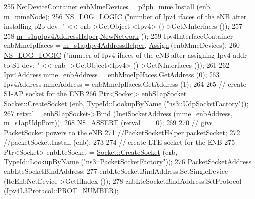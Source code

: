 \begin{DoxyCode}
255   NetDeviceContainer enbMmeDevices = p2ph\_mme.Install (enb, \hyperlink{classns3_1_1MmWavePointToPointEpcHelper_a4e2e32e1abb0ca817e30be4eb46ebfd0}{m\_mmeNode});
256   \hyperlink{group__logging_ga88acd260151caf2db9c0fc84997f45ce}{NS\_LOG\_LOGIC} (\textcolor{stringliteral}{"number of Ipv4 ifaces of the eNB after installing p2p dev: "} << enb->GetObject
      <Ipv4> ()->GetNInterfaces ());  
257 
258   \hyperlink{classns3_1_1MmWavePointToPointEpcHelper_ab92256e97561ddae3bf75005d3197d7a}{m\_s1apIpv4AddressHelper}.\hyperlink{classns3_1_1Ipv4AddressHelper_a3277d133ef0d2669934a16a8206ba8e4}{NewNetwork} ();
259   Ipv4InterfaceContainer enbMmeIpIfaces = \hyperlink{classns3_1_1MmWavePointToPointEpcHelper_ab92256e97561ddae3bf75005d3197d7a}{m\_s1apIpv4AddressHelper}.
      \hyperlink{classns3_1_1Ipv4AddressHelper_af8e7f4a1a7e74c00014a1eac445a27af}{Assign} (enbMmeDevices);
260   \hyperlink{group__logging_ga88acd260151caf2db9c0fc84997f45ce}{NS\_LOG\_LOGIC} (\textcolor{stringliteral}{"number of Ipv4 ifaces of the eNB after assigning Ipv4 addr to S1 dev: "} << enb
      ->GetObject<Ipv4> ()->GetNInterfaces ());
261   
262   Ipv4Address mme\_enbAddress = enbMmeIpIfaces.GetAddress (0);
263   Ipv4Address mmeAddress = enbMmeIpIfaces.GetAddress (1);
264 
265   \textcolor{comment}{// create S1-AP socket for the ENB}
266   Ptr<Socket> enbS1apSocket = \hyperlink{classns3_1_1Socket_ad448a62bb50ad3dbac59c879a885a8d2}{Socket::CreateSocket} (enb, 
      \hyperlink{classns3_1_1TypeId_a119cf99c20931fdc294602cd360b180e}{TypeId::LookupByName} (\textcolor{stringliteral}{"ns3::UdpSocketFactory"}));
267   retval = enbS1apSocket->Bind (InetSocketAddress (mme\_enbAddress, \hyperlink{classns3_1_1MmWavePointToPointEpcHelper_ad1f7549ba3936b11b31d87caba866d76}{m\_s1apUdpPort}));
268   \hyperlink{assert_8h_a6dccdb0de9b252f60088ce281c49d052}{NS\_ASSERT} (retval == 0);
269 
270   \textcolor{comment}{// give PacketSocket powers to the eNB}
271   \textcolor{comment}{//PacketSocketHelper packetSocket;}
272   \textcolor{comment}{//packetSocket.Install (enb); }
273   
274   \textcolor{comment}{// create LTE socket for the ENB }
275   Ptr<Socket> enbLteSocket = \hyperlink{classns3_1_1Socket_ad448a62bb50ad3dbac59c879a885a8d2}{Socket::CreateSocket} (enb, 
      \hyperlink{classns3_1_1TypeId_a119cf99c20931fdc294602cd360b180e}{TypeId::LookupByName} (\textcolor{stringliteral}{"ns3::PacketSocketFactory"}));
276   PacketSocketAddress enbLteSocketBindAddress;
277   enbLteSocketBindAddress.SetSingleDevice (lteEnbNetDevice->GetIfIndex ());
278   enbLteSocketBindAddress.SetProtocol (\hyperlink{classns3_1_1Ipv4L3Protocol_a0146bc84815b7b73adb9c62cdafc9442}{Ipv4L3Protocol::PROT\_NUMBER});

\end{DoxyCode}
